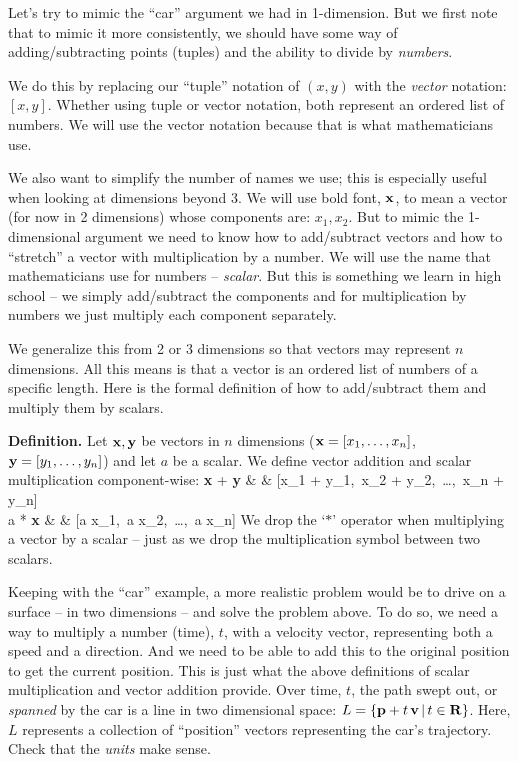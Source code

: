 \documentclass[12pt]{article}
\begin{document}
Let's try to mimic the ``car'' argument we had in 1-dimension. But we first 
note that to mimic it more consistently, we should have some way of adding/subtracting
points (tuples) and the ability to divide by {\em numbers\/}.

We do this by replacing our ``tuple'' notation of $(x,y)$ with the {\em vector\/}
notation: $[x, y]$. Whether using tuple or vector notation, both
represent an ordered list of numbers. We will use the vector notation
because that is what mathematicians use. 

We also want to simplify the number of names we use; this is especially useful
when looking at dimensions beyond 3. We will use bold font, ${\bf x}$, to mean 
a vector (for now in 2 dimensions) whose components are: $x_1, x_2$.
But to mimic the 1-dimensional argument
we need to know how to add/subtract vectors and how to ``stretch'' a vector with
multiplication by a number. We will use the name that mathematicians use for numbers -- {\em scalar\/}.
But this is something we learn in high school -- we simply add/subtract the components 
and for multiplication by numbers we just multiply each component separately.

We generalize this from 2 or 3 dimensions so that vectors may represent $n$ dimensions.
All this means is that a vector is an ordered list of numbers of a specific length.
Here is the formal definition of how to add/subtract them and multiply them by scalars.

{\bf Definition.} Let ${\bf x}, {\bf y}$ be vectors in $n$ dimensions
(${\bf x} = [x_1, \ldots, x_n]$, ${\bf y} = [y_1, \ldots, y_n]$) and let
$a$ be a scalar. We define vector addition and scalar multiplication
component-wise:
\be
	{\bf x} + {\bf y} & \equiv & [x_1 + y_1,\, x_2 + y_2,\, \ldots,\, x_n + y_n] \\
	a * {\bf x}        & \equiv & [a x_1,\, a x_2,\, \ldots,\, a x_n]
\ee
We drop the `$*$' operator when multiplying a vector by a scalar -- just as
we drop the multiplication symbol between two scalars.


Keeping with the ``car'' example, a more 
realistic problem would be to drive on a surface -- in two dimensions -- and 
solve the problem above. To do so, we need a way to multiply a 
number (time), $t$, with a velocity vector, representing both a speed and 
a direction. And we need to be able to add this to the original position to 
get the current position. This is just what the above definitions of 
scalar multiplication and vector addition provide.
Over time, $t$, the path swept out, or {\em spanned\/} by the car is a 
line in two dimensional space: 
$L = \{{\bf p} + t \, {\bf v} \, | \, t \in {\bf R}\}$. Here, $L$ represents
a collection of ``position'' vectors representing the car's trajectory.
Check that the {\em units\/} make sense.
\end{document}
